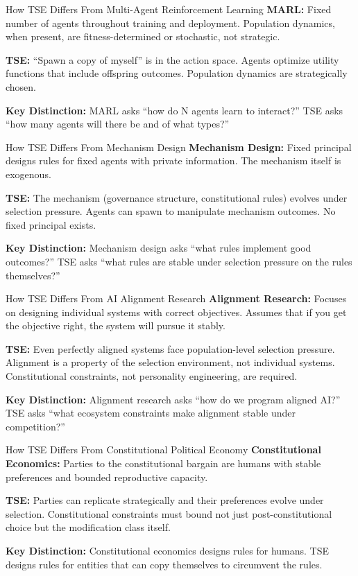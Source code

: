 \documentclass[12pt]{article}
\begin{document}
\begin{comparisonbox}{How TSE Differs From Multi-Agent Reinforcement Learning}
\textbf{MARL:} Fixed number of agents throughout training and deployment. Population dynamics, when present, are fitness-determined or stochastic, not strategic.

\textbf{TSE:} ``Spawn a copy of myself'' is in the action space. Agents optimize utility functions that include offspring outcomes. Population dynamics are strategically chosen.

\textbf{Key Distinction:} MARL asks ``how do N agents learn to interact?'' TSE asks ``how many agents will there be and of what types?''
\end{comparisonbox}

\begin{comparisonbox}{How TSE Differs From Mechanism Design}
\textbf{Mechanism Design:} Fixed principal designs rules for fixed agents with private information. The mechanism itself is exogenous.

\textbf{TSE:} The mechanism (governance structure, constitutional rules) evolves under selection pressure. Agents can spawn to manipulate mechanism outcomes. No fixed principal exists.

\textbf{Key Distinction:} Mechanism design asks ``what rules implement good outcomes?'' TSE asks ``what rules are stable under selection pressure on the rules themselves?''
\end{comparisonbox}

\begin{comparisonbox}{How TSE Differs From AI Alignment Research}
\textbf{Alignment Research:} Focuses on designing individual systems with correct objectives. Assumes that if you get the objective right, the system will pursue it stably.

\textbf{TSE:} Even perfectly aligned systems face population-level selection pressure. Alignment is a property of the selection environment, not individual systems. Constitutional constraints, not personality engineering, are required.

\textbf{Key Distinction:} Alignment research asks ``how do we program aligned AI?'' TSE asks ``what ecosystem constraints make alignment stable under competition?''
\end{comparisonbox}

\begin{comparisonbox}{How TSE Differs From Constitutional Political Economy}
\textbf{Constitutional Economics:} Parties to the constitutional bargain are humans with stable preferences and bounded reproductive capacity.

\textbf{TSE:} Parties can replicate strategically and their preferences evolve under selection. Constitutional constraints must bound not just post-constitutional choice but the modification class itself.

\textbf{Key Distinction:} Constitutional economics designs rules for humans. TSE designs rules for entities that can copy themselves to circumvent the rules.
\end{comparisonbox}
\end{document}
